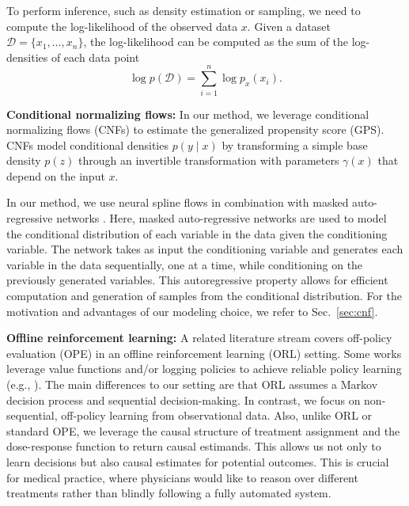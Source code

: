 To perform inference, such as density estimation or sampling, we need to compute the log-likelihood of the observed data ${x}$. Given a dataset $\mathcal{D} = \{{x}_1, \ldots, {x}_n\}$, the log-likelihood can be computed as the sum of the log-densities of each data point
\begin{equation}
    \log p(\mathcal{D}) = \sum_{i=1}^n \log p_x(x_i) .
\end{equation}

\textbf{Conditional normalizing flows:} In our method, we leverage conditional normalizing flows (CNFs) \cite{trippe2018conditional,winkler2019learning} to estimate the generalized propensity score (GPS). CNFs model conditional densities $p(y \mid x)$ by transforming a simple base density $p(z)$ through an invertible transformation with parameters $\gamma(x)$ that depend on the input $x$.

In our method, we use neural spline flows \cite{durkan2019neural} in combination with masked auto-regressive networks \cite{dolatabadi2020invertible}. Here, masked auto-regressive networks are used to model the conditional distribution of each variable in the data given the conditioning variable. The network takes as input the conditioning variable and generates each variable in the data sequentially, one at a time, while conditioning on the previously generated variables. This autoregressive property allows for efficient computation and generation of samples from the conditional distribution.
For the motivation and advantages of our modeling choice, we refer to Sec.~\ref{sec:cnf}.

\textbf{Offline reinforcement learning:} A related literature stream covers off-policy evaluation (OPE) in an offline reinforcement learning (ORL) setting. Some works leverage value functions and/or logging policies to achieve reliable policy learning (e.g., \cite{fujimoto2019off, kumar2020conservative, kumar2019stabilizing}). The main differences to our setting are that ORL assumes a Markov decision process and sequential decision-making. In contrast, we focus on non-sequential, off-policy learning from observational data. Also, unlike ORL or standard OPE, we leverage the causal structure of treatment assignment and the dose-response function to return causal estimands. This allows us not only to learn decisions but also causal estimates for potential outcomes. This is crucial for medical practice, where physicians would like to reason over different treatments rather than blindly following a fully automated system.



